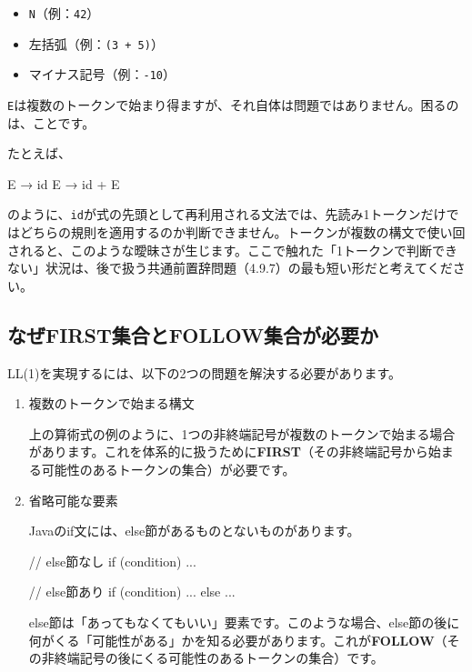 \begin{itemize}
\item
  \texttt{N}（例：\texttt{42}）
\item
  左括弧（例：\texttt{(3\ +\ 5)}）
\item
  マイナス記号（例：\texttt{-10}）
\end{itemize}

\texttt{E}は複数のトークンで始まり得ますが、それ自体は問題ではありません。困るのは、ことです。

たとえば、

\begin{codescreen}{}
E → id
E → id + E
\end{codescreen}

\noindent のように、\texttt{id}が式の先頭として再利用される文法では、先読み1トークンだけではどちらの規則を適用するのか判断できません。トークンが複数の構文で使い回されると、このような曖昧さが生じます。ここで触れた「1トークンで判断できない」状況は、後で扱う共通前置辞問題（4.9.7）の最も短い形だと考えてください。

\subsection{なぜFIRST集合とFOLLOW集合が必要か}

LL(1)を実現するには、以下の2つの問題を解決する必要があります。

\begin{enumerate}
\item
  複数のトークンで始まる構文

上の算術式の例のように、1つの非終端記号が複数のトークンで始まる場合があります。これを体系的に扱うために\textbf{\sffamily FIRST}（その非終端記号から始まる可能性のあるトークンの集合）が必要です。

\item
  省略可能な要素

Javaのif文には、else節があるものとないものがあります。

\begin{codescreen}{}
// else節なし
if (condition) { ... }

// else節あり
if (condition) { ... } else { ... }
\end{codescreen}

else節は「あってもなくてもいい」要素です。このような場合、else節の後に何がくる「可能性がある」かを知る必要があります。これが\textbf{\sffamily FOLLOW}（その非終端記号の後にくる可能性のあるトークンの集合）です。
\end{enumerate}

